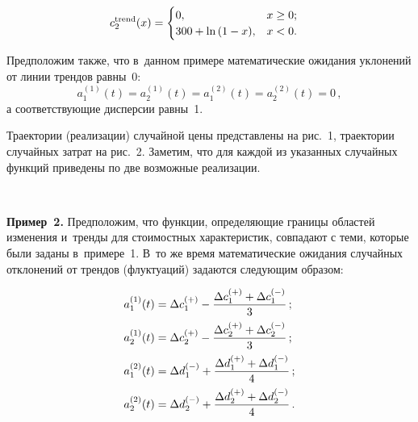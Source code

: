\begin{multicols}{2}
  \noindent
    \begin{align*}
c_2^{\mathrm{trend}}(x)&= \begin{cases}
  0, & x\hm\geq0;\\
  300 + \ln{(1-x)}, & x\hm<0.
  \end{cases}
\end{align*}


Предположим также, что в~данном примере математические ожидания уклонений от 
линии трендов равны~0:
$$
a_1^{(1)}(t)=a_2^{(1)}(t)=a_1^{(2)}(t)=a_2^{(2)}(t)=0\,,
$$
а соответствующие дисперсии равны~1.

Траектории (реализации) случайной цены представлены на рис.~1, траектории 
случайных затрат на рис.~2. Заметим, что для каждой из указанных случайных 
функций приведены по две возможные реализации.


\begin{figure*} %
 \vspace*{1pt}
\begin{center}
   \mbox{%
\epsfxsize=161.435mm 
}
\end{center}
\vspace*{-12pt}
\vspace*{-6pt}
\end{figure*}
%



\noindent
\textbf{Пример~2.} Предположим, что функции, определяющие границы областей 
изменения и~тренды для стоимостных характеристик, совпадают с теми, которые были 
заданы в~примере~1. В~то же время математические ожидания случайных отклонений 
от трендов (флуктуаций) задаются сле\-ду\-ющим образом:

\vspace*{-6pt}

\noindent
\begin{align*}
a_1^{(1)}(t)&=\Delta c_1^{(+)}-\displaystyle\frac{\displaystyle \Delta c_1^{(+)}+\Delta c_1^{(-)}\mathstrut}{\displaystyle 3\mathstrut}\,;\\[-1pt]
a_2^{(1)}(t)&=\Delta c_2^{(+)}-\displaystyle\frac{\displaystyle \Delta c_2^{(+)}+\Delta c_2^{(-)}\mathstrut}{\displaystyle 3\mathstrut}\,;
\\[-1pt]
a_1^{(2)}(t)&=\Delta d_1^{(-)}+\displaystyle\frac{\displaystyle \Delta d_1^{(+)}+\Delta d_1^{(-)}\mathstrut}{\displaystyle 4\mathstrut}\,;\\[-1pt]
a_2^{(2)}(t)&=\Delta d_2^{(-)}+\displaystyle\frac{\displaystyle \Delta d_2^{(+)}+\Delta d_2^{(-)}\mathstrut}{\displaystyle 4\mathstrut}\,.
\end{align*}


\end{multicols}
